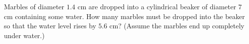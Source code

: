 Marbles of diameter $1.4$ cm are dropped into a cylindrical beaker of diameter $7$ cm containing some water. How many marbles must be dropped into the beaker so that the water level rises by $5.6$ cm? (Assume the marbles end up completely under water.)
